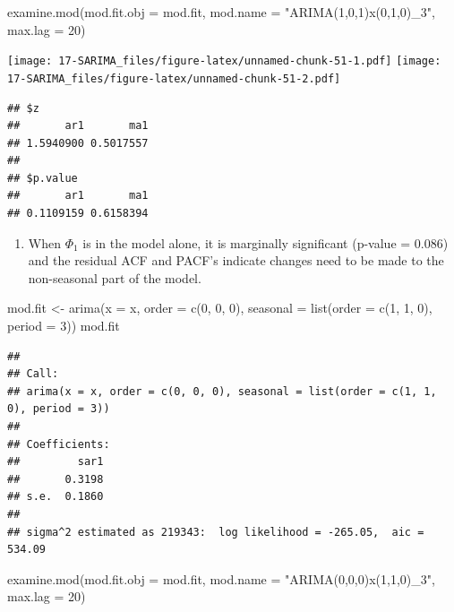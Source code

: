\documentclass[
]{book}
\newenvironment{Shaded}{\begin{snugshade}}{\end{snugshade}}
\newcommand{\AttributeTok}[1]{\textcolor[rgb]{0.77,0.63,0.00}{#1}}
\newcommand{\DecValTok}[1]{\textcolor[rgb]{0.00,0.00,0.81}{#1}}
\newcommand{\FunctionTok}[1]{\textcolor[rgb]{0.00,0.00,0.00}{#1}}
\newcommand{\NormalTok}[1]{#1}
\newcommand{\OtherTok}[1]{\textcolor[rgb]{0.56,0.35,0.01}{#1}}
\newcommand{\StringTok}[1]{\textcolor[rgb]{0.31,0.60,0.02}{#1}}
\providecommand{\tightlist}{%
  \setlength{\itemsep}{0pt}\setlength{\parskip}{0pt}}
\theoremstyle{definition}
\theoremstyle{definition}
\theoremstyle{definition}
\theoremstyle{definition}
\theoremstyle{remark}
\begin{document}
\begin{Shaded}
\begin{Highlighting}[]
  \FunctionTok{examine.mod}\NormalTok{(}\AttributeTok{mod.fit.obj =}\NormalTok{ mod.fit, }\AttributeTok{mod.name =} \StringTok{"ARIMA(1,0,1)x(0,1,0)\_3"}\NormalTok{, }\AttributeTok{max.lag =} \DecValTok{20}\NormalTok{)}
\end{Highlighting}
\end{Shaded}

\texttt{[image: 17-SARIMA\_files/figure-latex/unnamed-chunk-51-1.pdf]} \texttt{[image: 17-SARIMA\_files/figure-latex/unnamed-chunk-51-2.pdf]}

\begin{verbatim}
## $z
##       ar1       ma1 
## 1.5940900 0.5017557 
## 
## $p.value
##       ar1       ma1 
## 0.1109159 0.6158394
\end{verbatim}

\begin{enumerate}
\def\labelenumi{\arabic{enumi}.}
\setcounter{enumi}{2}
\tightlist
\item
  When \(\Phi_1\) is in the model alone, it is marginally significant (p-value = 0.086) and the residual ACF and PACF's indicate changes need to be made to the non-seasonal part of the model.
\end{enumerate}

\begin{Shaded}
\begin{Highlighting}[]
\NormalTok{  mod.fit }\OtherTok{\textless{}{-}} \FunctionTok{arima}\NormalTok{(}\AttributeTok{x =}\NormalTok{ x, }\AttributeTok{order =} \FunctionTok{c}\NormalTok{(}\DecValTok{0}\NormalTok{, }\DecValTok{0}\NormalTok{, }\DecValTok{0}\NormalTok{), }\AttributeTok{seasonal =} \FunctionTok{list}\NormalTok{(}\AttributeTok{order =} \FunctionTok{c}\NormalTok{(}\DecValTok{1}\NormalTok{, }\DecValTok{1}\NormalTok{, }\DecValTok{0}\NormalTok{), }\AttributeTok{period =} \DecValTok{3}\NormalTok{))}
\NormalTok{  mod.fit}
\end{Highlighting}
\end{Shaded}

\begin{verbatim}
## 
## Call:
## arima(x = x, order = c(0, 0, 0), seasonal = list(order = c(1, 1, 0), period = 3))
## 
## Coefficients:
##         sar1
##       0.3198
## s.e.  0.1860
## 
## sigma^2 estimated as 219343:  log likelihood = -265.05,  aic = 534.09
\end{verbatim}

\begin{Shaded}
\begin{Highlighting}[]
\FunctionTok{examine.mod}\NormalTok{(}\AttributeTok{mod.fit.obj =}\NormalTok{ mod.fit, }\AttributeTok{mod.name =} \StringTok{"ARIMA(0,0,0)x(1,1,0)\_3"}\NormalTok{, }\AttributeTok{max.lag =} \DecValTok{20}\NormalTok{)}
\end{Highlighting}
\end{Shaded}
\end{document}
